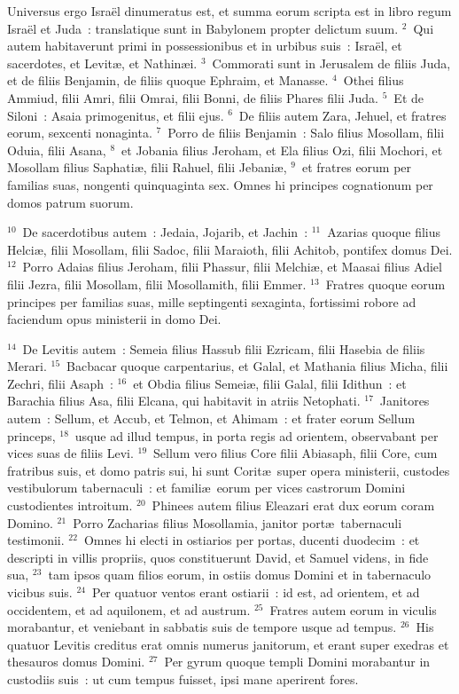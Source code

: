 \bchapter
\lettrine[lines=3,image=true,loversize=0.05,lraise=-0.03]{U}{}niversus ergo Isra\"el dinumeratus est, et summa eorum scripta est in libro regum Isra\"el et Juda~: translatique sunt in Babylonem propter delictum suum.
${}^{2}$~Qui autem habitaverunt primi in possessionibus et in urbibus suis~: Isra\"el, et sacerdotes, et Levit\ae , et Nathin\ae i.
${}^{3}$~Commorati sunt in Jerusalem de filiis Juda, et de filiis Benjamin, de filiis quoque Ephraim, et Manasse.
${}^{4}$~Othei filius Ammiud, filii Amri, filii Omrai, filii Bonni, de filiis Phares filii Juda.
${}^{5}$~Et de Siloni~: Asaia primogenitus, et filii ejus.
${}^{6}$~De filiis autem Zara, Jehuel, et fratres eorum, sexcenti nonaginta.
${}^{7}$~Porro de filiis Benjamin~: Salo filius Mosollam, filii Oduia, filii Asana,
${}^{8}$~et Jobania filius Jeroham, et Ela filius Ozi, filii Mochori, et Mosollam filius Saphati\ae , filii Rahuel, filii Jebani\ae ,
${}^{9}$~et fratres eorum per familias suas, nongenti quinquaginta sex. Omnes hi principes cognationum per domos patrum suorum.


${}^{10}$~De sacerdotibus autem~: Jedaia, Jojarib, et Jachin~:
${}^{11}$~Azarias quoque filius Helci\ae , filii Mosollam, filii Sadoc, filii Maraioth, filii Achitob, pontifex domus Dei.
${}^{12}$~Porro Adaias filius Jeroham, filii Phassur, filii Melchi\ae , et Maasai filius Adiel filii Jezra, filii Mosollam, filii Mosollamith, filii Emmer.
${}^{13}$~Fratres quoque eorum principes per familias suas, mille septingenti sexaginta, fortissimi robore ad faciendum opus ministerii in domo Dei.


${}^{14}$~De Levitis autem~: Semeia filius Hassub filii Ezricam, filii Hasebia de filiis Merari.
${}^{15}$~Bacbacar quoque carpentarius, et Galal, et Mathania filius Micha, filii Zechri, filii Asaph~:
${}^{16}$~et Obdia filius Semei\ae , filii Galal, filii Idithun~: et Barachia filius Asa, filii Elcana, qui habitavit in atriis Netophati.
${}^{17}$~Janitores autem~: Sellum, et Accub, et Telmon, et Ahimam~: et frater eorum Sellum princeps,
${}^{18}$~usque ad illud tempus, in porta regis ad orientem, observabant per vices suas de filiis Levi.
${}^{19}$~Sellum vero filius Core filii Abiasaph, filii Core, cum fratribus suis, et domo patris sui, hi sunt Corit\ae\ super opera ministerii, custodes vestibulorum tabernaculi~: et famili\ae\ eorum per vices castrorum Domini custodientes introitum.
${}^{20}$~Phinees autem filius Eleazari erat dux eorum coram Domino.
${}^{21}$~Porro Zacharias filius Mosollamia, janitor port\ae\ tabernaculi testimonii.
${}^{22}$~Omnes hi electi in ostiarios per portas, ducenti duodecim~: et descripti in villis propriis, quos constituerunt David, et Samuel videns, in fide sua,
${}^{23}$~tam ipsos quam filios eorum, in ostiis domus Domini et in tabernaculo vicibus suis.
${}^{24}$~Per quatuor ventos erant ostiarii~: id est, ad orientem, et ad occidentem, et ad aquilonem, et ad austrum.
${}^{25}$~Fratres autem eorum in viculis morabantur, et veniebant in sabbatis suis de tempore usque ad tempus.
${}^{26}$~His quatuor Levitis creditus erat omnis numerus janitorum, et erant super exedras et thesauros domus Domini.
${}^{27}$~Per gyrum quoque templi Domini morabantur in custodiis suis~: ut cum tempus fuisset, ipsi mane aperirent fores.


